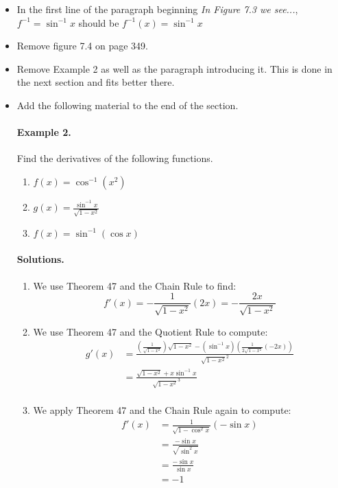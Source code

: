 \documentclass[12pt]{report}
\begin{document}
\begin{itemize}
\item In the first line of the paragraph beginning \emph{In Figure 7.3 we see...}, $f^{-1}=\sin^{-1} x$ should be $f^{-1}(x)=\sin^{-1}x$
\item Remove figure 7.4 on page 349.
\item Remove Example 2 as well as the paragraph introducing it. This is done in the next section and fits better there.
\item Add the following material to the end of the section.

{\color{blue}
\paragraph{Example 2.} Find the derivatives of the following functions.

\begin{enumerate}
\item $f(x)=\cos^{-1}(x^2)$
\item $\displaystyle g(x)=\frac{\sin^{-1}x}{\sqrt{1-x^2}}$
\item $f(x)=\sin^{-1}(\cos x)$
\end{enumerate}

\paragraph{Solutions.}

\begin{enumerate}
\item We use Theorem 47 and the Chain Rule to find: \[f'(x)=-\frac{1}{\sqrt{1-x^2}}(2x)=- \frac{2x}{\sqrt{1-x^2}}\]
\item We use Theorem 47 and the Quotient Rule to compute: 
\begin{equation*}
\begin{split}
g'(x)&=\frac{\left(\frac 1{\sqrt{1-x^2}}\right)\sqrt{1-x^2} - (\sin^{-1} x)\left( \frac 1{2\sqrt{1-x^2}} (-2x)\right)}{\sqrt{1-x^2}^2}\\
&=\frac{\sqrt{1-x^2}+x\sin^{-1}x}{\sqrt{1-x^2}^3}\\
\end{split}
\end{equation*}
\item We apply Theorem 47 and the Chain Rule again to compute:
\begin{equation*}
\begin{split}
f'(x)&=\frac{1}{\sqrt{1-\cos^2x}}(-\sin x)\\
&=\frac{-\sin x}{\sqrt{\sin^2x}}\\
&=\frac{-\sin x}{\sin x}\\
&=-1\\
\end{split}
\end{equation*}
\end{enumerate}

}
\end{itemize}
\end{document}
